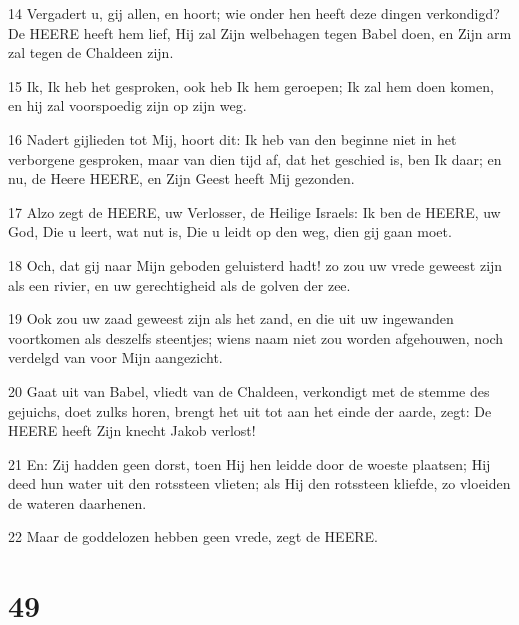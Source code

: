 \par 14 Vergadert u, gij allen, en hoort; wie onder hen heeft deze dingen verkondigd? De HEERE heeft hem lief, Hij zal Zijn welbehagen tegen Babel doen, en Zijn arm zal tegen de Chaldeen zijn.
\par 15 Ik, Ik heb het gesproken, ook heb Ik hem geroepen; Ik zal hem doen komen, en hij zal voorspoedig zijn op zijn weg.
\par 16 Nadert gijlieden tot Mij, hoort dit: Ik heb van den beginne niet in het verborgene gesproken, maar van dien tijd af, dat het geschied is, ben Ik daar; en nu, de Heere HEERE, en Zijn Geest heeft Mij gezonden.
\par 17 Alzo zegt de HEERE, uw Verlosser, de Heilige Israels: Ik ben de HEERE, uw God, Die u leert, wat nut is, Die u leidt op den weg, dien gij gaan moet.
\par 18 Och, dat gij naar Mijn geboden geluisterd hadt! zo zou uw vrede geweest zijn als een rivier, en uw gerechtigheid als de golven der zee.
\par 19 Ook zou uw zaad geweest zijn als het zand, en die uit uw ingewanden voortkomen als deszelfs steentjes; wiens naam niet zou worden afgehouwen, noch verdelgd van voor Mijn aangezicht.
\par 20 Gaat uit van Babel, vliedt van de Chaldeen, verkondigt met de stemme des gejuichs, doet zulks horen, brengt het uit tot aan het einde der aarde, zegt: De HEERE heeft Zijn knecht Jakob verlost!
\par 21 En: Zij hadden geen dorst, toen Hij hen leidde door de woeste plaatsen; Hij deed hun water uit den rotssteen vlieten; als Hij den rotssteen kliefde, zo vloeiden de wateren daarhenen.
\par 22 Maar de goddelozen hebben geen vrede, zegt de HEERE.

\chapter{49}

